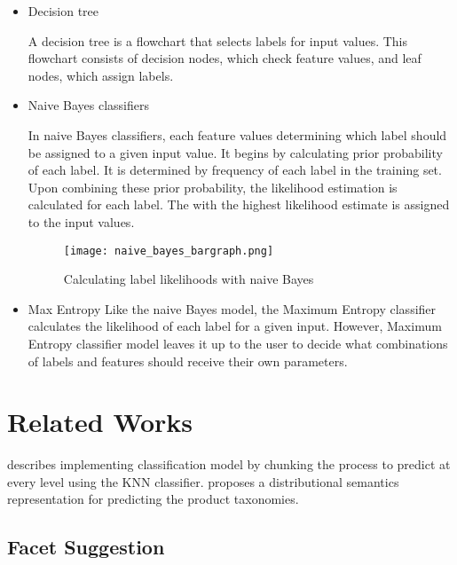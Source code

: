 \begin{itemize}
    \item Decision  tree
    
    A decision tree is a flowchart that selects labels for input values. This flowchart consists of decision nodes, which check feature values, and leaf nodes, which assign labels. 

    \item Naive Bayes classifiers
    
    In naive Bayes classifiers, each feature values determining which label should be assigned to a given input value. It begins by calculating prior probability of each label. It is determined by frequency of each label in the training set. Upon combining these prior probability, the likelihood estimation is calculated for each label. The with the highest likelihood estimate is assigned to the input values.


    \begin{figure}[H]
        \centering    
        \texttt{[image: naive\_bayes\_bargraph.png]}
        \caption{Calculating label likelihoods with naive Bayes \parencite{BirdKleinLoper09}}
        \label{fig:Calculating label likelihoods with naive Bayes}
    \end{figure}

    \item Max Entropy
    Like the naive Bayes model, the Maximum Entropy classifier calculates the likelihood of each label for a given input.
    However, Maximum Entropy classifier model leaves it up to the user to decide what combinations of labels and features should receive their own parameters.

\end{itemize}

\section{Related Works}

\parencite{AliCevahir.} describes implementing classification model by chunking the process to predict at every level using the \acl*{KNN} classifier. \parencite{Gupta.20062016}  proposes a distributional semantics representation for predicting the product taxonomies.

\subsection*{Facet Suggestion}


